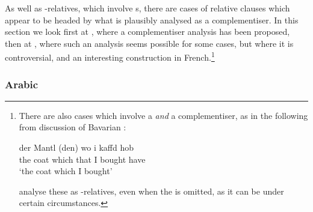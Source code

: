 \documentclass[output=paper,nonflat,draftmode]{./langsci/langscibook}
\begin{document}
As well as -relatives, which involve s, there are cases of relative clauses
which appear to be headed by what is plausibly analysed as a complementiser. In this
section we look first at , where a complementiser analysis has been proposed, 
then at , where such an analysis seems possible for some cases, but where it is
controversial, and an interesting construction in French.\footnote{There are also cases which involve a  \emph{and} a
  complementiser, as in the following from  discussion of Bavarian :
  \begin{exe}
    \ex \gll der Mantl (den) wo i kaffd hob\\
    the coat which that I bought have\\
    \glt `the coat which I bought’
  \end{exe}
  \cite{Hinrichs:Nakazawa:02} analyse these as -relatives, even when
  the  is omitted, as it can be under certain circumstances. 
}

\subsubsection{Arabic}
\label{sec:rc-arabic}
\end{document}
